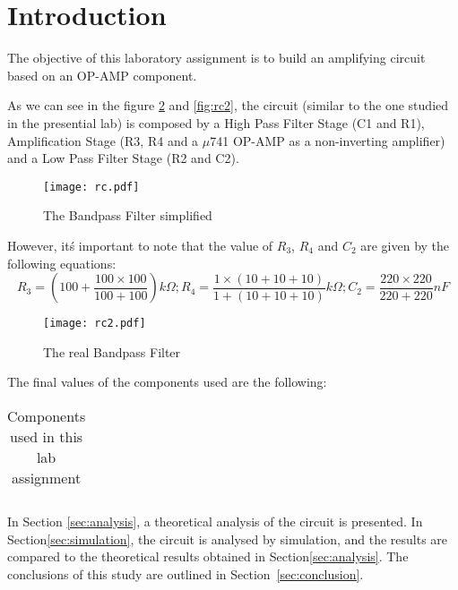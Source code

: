 \section{Introduction}
\label{sec:introduction}

The objective of this laboratory assignment is to build an amplifying circuit based on an OP-AMP component.

As we can see in the figure \ref{fig:rc} and \ref{fig:rc2}, the circuit (similar to the one studied in the presential lab) is composed by a High Pass Filter Stage (C1 and R1), Amplification Stage (R3, R4 and a $\mu$741 OP-AMP as a non-inverting amplifier) and a Low Pass Filter Stage (R2 and C2).

\begin{figure}[h] \centering
\texttt{[image: rc.pdf]}
\vspace{-5mm}
\caption{The Bandpass Filter simplified}\label{fig:rc}
\end{figure}

However, itś important to note that the value of $R_3$, $R_4$ and $C_2$ are given by the following equations:
\begin{equation}
 R_3= (100+ \frac{100\times100}{100+100}) k\Omega;     
 R_4= \frac{1\times(10+10+10)}{1+(10+10+10)} k\Omega;     
 C_2=\frac{220\times220}{220+220} nF
 \end{equation}

\begin{figure}[h] \centering
\texttt{[image: rc2.pdf]}
\vspace{-5mm}
\caption{The real Bandpass Filter }\label{fig:rc}
\end{figure}

The final values of the components used are the following:

\begin{table}[!htb]
\centering
  \begin{tabular}{|c|c|}
    \hline    
    
 \end{tabular}
 \caption{Components used in this lab assignment}\label{tab:components}
\end{table}


In Section \ref{sec:analysis}, a theoretical analysis of the circuit is presented. In Section\ref{sec:simulation}, the circuit is analysed by simulation, and the results are compared to the theoretical results obtained in Section\ref{sec:analysis}. The conclusions of this study are outlined in Section~\ref{sec:conclusion}.







